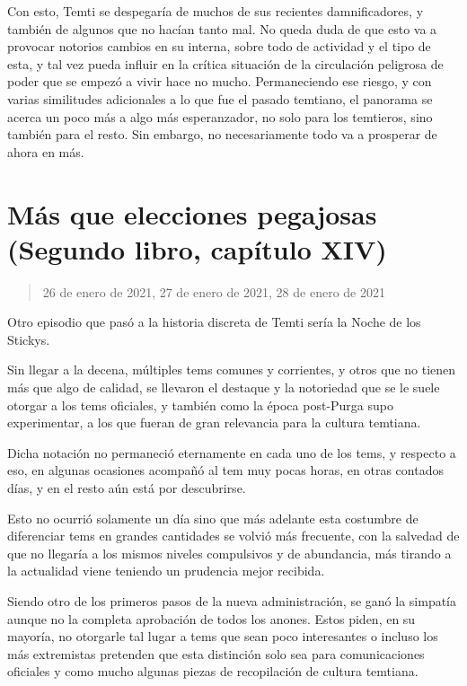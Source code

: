 \documentclass[
]{book}
\begin{document}
Con esto, Temti se despegaría de muchos de sus recientes damnificadores, y también de algunos que no hacían tanto mal. No queda duda de que esto va a provocar notorios cambios en su interna, sobre todo de actividad y el tipo de esta, y tal vez pueda influir en la crítica situación de la circulación peligrosa de poder que se empezó a vivir hace no mucho. Permaneciendo ese riesgo, y con varias similitudes adicionales a lo que fue el pasado temtiano, el panorama se acerca un poco más a algo más esperanzador, no solo para los temtieros, sino también para el resto. Sin embargo, no necesariamente todo va a prosperar de ahora en más.

\hypertarget{muxe1s-que-elecciones-pegajosas-segundo-libro-capuxedtulo-xiv}{%
\section{Más que elecciones pegajosas (Segundo libro, capítulo XIV)}\label{muxe1s-que-elecciones-pegajosas-segundo-libro-capuxedtulo-xiv}}

\begin{quote}
26 de enero de 2021, 27 de enero de 2021, 28 de enero de 2021
\end{quote}

Otro episodio que pasó a la historia discreta de Temti sería la Noche de los Stickys.

Sin llegar a la decena, múltiples tems comunes y corrientes, y otros que no tienen más que algo de calidad, se llevaron el destaque y la notoriedad que se le suele otorgar a los tems oficiales, y también como la época post-Purga supo experimentar, a los que fueran de gran relevancia para la cultura temtiana.

Dicha notación no permaneció eternamente en cada uno de los tems, y respecto a eso, en algunas ocasiones acompañó al tem muy pocas horas, en otras contados días, y en el resto aún está por descubrirse.

Esto no ocurrió solamente un día sino que más adelante esta costumbre de diferenciar tems en grandes cantidades se volvió más frecuente, con la salvedad de que no llegaría a los mismos niveles compulsivos y de abundancia, más tirando a la actualidad viene teniendo un prudencia mejor recibida.

Siendo otro de los primeros pasos de la nueva administración, se ganó la simpatía aunque no la completa aprobación de todos los anones. Estos piden, en su mayoría, no otorgarle tal lugar a tems que sean poco interesantes o incluso los más extremistas pretenden que esta distinción solo sea para comunicaciones oficiales y como mucho algunas piezas de recopilación de cultura temtiana.
\end{document}

